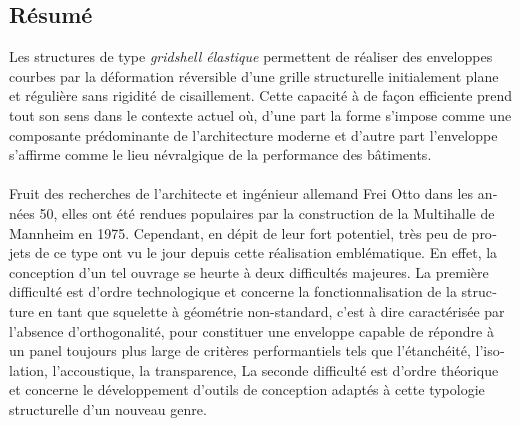 \begin{otherlanguage}{french}
\cleardoublepage
\chapter*{Résumé}
Les structures de type \emph{gridshell élastique} permettent de réaliser des enveloppes courbes par la déformation réversible d'une grille structurelle initialement plane et régulière sans rigidité de cisaillement. Cette capacité à  de façon efficiente prend tout son sens dans le contexte actuel où, d’une part la forme s'impose comme une composante prédominante de l'architecture moderne et d’autre part l'enveloppe s'affirme comme le lieu névralgique de la performance des bâtiments.
\\
\\
Fruit des recherches de l'architecte et ingénieur allemand Frei Otto dans les années 50, elles ont été rendues populaires par la construction de la Multihalle de Mannheim en 1975. Cependant, en dépit de leur fort potentiel, très peu de projets de ce type ont vu le jour depuis cette réalisation emblématique. En effet, la conception d'un tel ouvrage se heurte à deux difficultés majeures. La première difficulté est d'ordre technologique et concerne la fonctionnalisation de la structure en tant que squelette à géométrie non-standard, c'est à dire caractérisée par l'absence d'orthogonalité, pour constituer une enveloppe capable de répondre à un panel toujours plus large de critères performantiels tels que l'étanchéité, l'isolation, l'accoustique, la transparence, \telp{} La seconde difficulté est d'ordre théorique et concerne le développement d'outils de conception adaptés à cette typologie structurelle d'un nouveau genre.
%
%
%
%
%
%
%
%
%
%
%
%

\end{otherlanguage}
